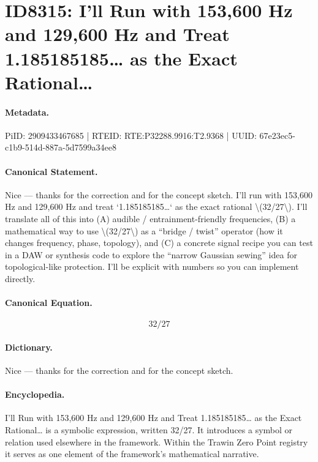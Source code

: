 \section*{ID8315: I’ll Run with 153,600 Hz and 129,600 Hz and Treat 1.185185185… as the Exact Rational…}
\paragraph{Metadata.}
PiID: 2909433467685 | RTEID: RTE:P32288.9916:T2.9368 | UUID: 67e23ec5-c1b9-514d-887a-5d7599a34ee8

\paragraph{Canonical Statement.}
Nice — thanks for the correction and for the concept sketch. I’ll run with 153,600 Hz and 129,600 Hz and treat `1.185185185…` as the exact rational \textbackslash{}(32/27\textbackslash{}). I’ll translate all of this into (A) audible / entrainment-friendly frequencies, (B) a mathematical way to use \textbackslash{}(32/27\textbackslash{}) as a “bridge / twist” operator (how it changes frequency, phase, topology), and (C) a concrete signal recipe you can test in a DAW or synthesis code to explore the “narrow Gaussian sewing” idea for topological-like protection. I’ll be explicit with numbers so you can implement directly.

\paragraph{Canonical Equation.}
\[
32/27
\]

\paragraph{Dictionary.}
Nice — thanks for the correction and for the concept sketch.

\paragraph{Encyclopedia.}
I’ll Run with 153,600 Hz and 129,600 Hz and Treat 1.185185185… as the Exact Rational… is a symbolic expression, written 32/27. It introduces a symbol or relation used elsewhere in the framework. Within the Trawin Zero Point registry it serves as one element of the framework's mathematical narrative.
